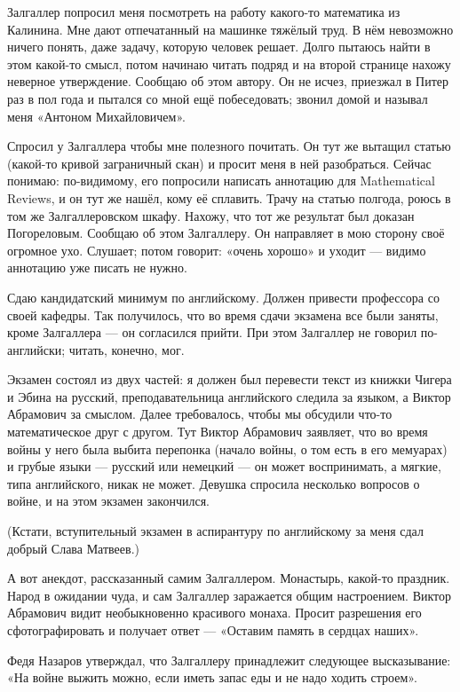 \documentclass{book}
\begin{document}
Залгаллер попросил меня посмотреть на работу какого-то математика из Калинина.
Мне дают отпечатанный на машинке тяжёлый труд.
В нём невозможно ничего понять, даже задачу, которую человек решает.
Долго пытаюсь найти в этом какой-то смысл,
потом начинаю читать подряд и на второй странице нахожу неверное утверждение.
Сообщаю об этом автору.
Он не исчез, приезжал в Питер раз в пол года и пытался со мной ещё побеседовать;
звонил домой и называл меня «Антоном Михайловичем».

Спросил у Залгаллера чтобы мне полезного почитать.
Он тут же вытащил статью (какой-то кривой заграничный скан) и просит меня в ней разобраться.
Сейчас понимаю: по-видимому, его попросили написать аннотацию для Mathematical Reviews, и он тут же нашёл, кому её сплавить.
Трачу на статью полгода, роюсь в том же Залгаллеровском шкафу.
Нахожу, что тот же результат был доказан Погореловым.
Сообщаю об этом Залгаллеру.
Он направляет в мою сторону своё огромное ухо. 
Слушает; потом говорит: «очень хорошо» и уходит --- видимо аннотацию уже писать не нужно.

Сдаю кандидатский минимум по английскому.
Должен привести профессора со своей кафедры.
Так получилось, что во время сдачи экзамена все были заняты, кроме Залгаллера --- он согласился прийти.
При этом Залгаллер не говорил по-английски;
читать, конечно, мог.

Экзамен состоял из двух частей: я должен был перевести текст из книжки Чигера и Эбина на русский,
преподавательница английского следила за языком, а Виктор Абрамович за смыслом.
Далее требовалось, чтобы мы обсудили что-то математическое друг с другом.
Тут Виктор Абрамович заявляет, что во время войны у него была выбита перепонка (начало войны, о том есть в его мемуарах) и грубые языки --- русский или немецкий --- он может воспринимать, а мягкие, типа английского, никак не может.
Девушка спросила несколько вопросов о войне, и на этом экзамен закончился.

(Кстати, вступительный экзамен в аспирантуру по английскому за меня сдал добрый Слава Матвеев.)

А вот анекдот, рассказанный самим Залгаллером.
Монастырь, какой-то праздник.
Народ в ожидании чуда, и сам Залгаллер заражается общим настроением.
Виктор Абрамович видит необыкновенно красивого монаха.
Просит разрешения его сфотографировать и получает ответ --- «Оставим память в сердцах наших».

Федя Назаров утверждал, что Залгаллеру принадлежит следующее высказывание: «На войне выжить можно, если иметь запас еды и не надо ходить строем».
\end{document}
